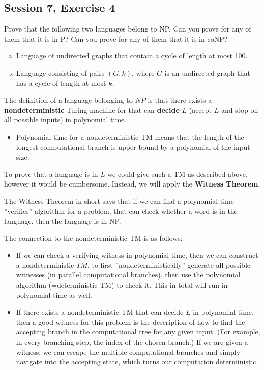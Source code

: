 \subsection {Session 7, Exercise 4}


Prove that the following two languages belong to NP. Can you prove for any of them that it is in P? Can you prove for any of them that it is in coNP?

\begin{enumerate}[a.)]
    \item Language of undirected graphs that contain a cycle of length at most 100.
    \item Language consisting of pairs $(G,k)$, where $G$ is an undirected graph that has a cycle of length at most $k$.
\end{enumerate}


The definition of a language belonging to $NP$ is that there exists a \textbf{nondeterministic} Turing-machine for that can \textbf{decide} $L$ (accept $L$ and stop on all possible inputs) in polynomial time.

\begin{itemize}
    \item Polynomial time for a nondeterministic TM means that the length of the longest computational branch is upper bound by a polynomial of the input size.
\end{itemize}

To prove that a language is in $L$ we could give such a TM as described above, however it would be cumbersome. Instead, we will apply the \textbf{Witness Theorem}.

The Witness Theorem in short says that if we can find a polynomial time ''verifier'' algorithm for a problem, that can check whether a word is in the language, then the language is in NP.

The connection to the nondeterministic TM is as follows:
\begin{itemize}
    \item If we can check a verifying witness in polynomial time, then we can construct a nondeterministic $TM$, to first ''nondeterministically'' generate all possible witnesses (in parallel computational branches), then use the polynomial algorithm (=deterministic TM) to check it. This in total will run in polynomial time as well.
    \item If there exists a nondeterministic TM that can decide $L$ in polynomial time, then a good witness for this problem is the description of how to find the accepting branch in the computational tree for any given input. (For example, in every branching step, the index of the chosen branch.) If we are given a witness, we can escape the multiple computational branches and simply navigate into the accepting state, which turns our computation deterministic.
\end{itemize}

